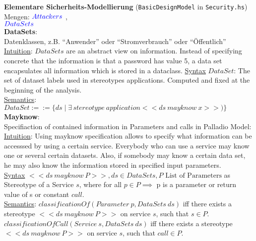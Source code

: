 \textbf{Elementare Sicherheits-Modellierung} (\texttt{BasicDesignModel} in \texttt{Security.hs})\\

Mengen: ${\color{blue}{Attackers}}$ , \\
        ${\color{blue}{DataSets}}$ \\
        
\textbf{DataSets}: \\
Datenklassen, z.B. \enquote{Anwender} oder \enquote{Stromverbrauch} oder \enquote{Öffentlich} \\
\underline{Intuition}: $DataSets$ are an abstract view on information. 
Instead of specifying concrete that the information is that a password has value 5, a data set encapsulates all information which is stored in a dataclass.
\underline{Syntax} $DataSet$: The set of dataset labels used in stereotypes applications. Computed and fixed at the beginning of the analysis. \\ %
\underline{Semantics}: $DataSet := := \{ds \mid \exists \, stereotype~application <<ds~mayknow~x>>)\}$\\ %

\textbf{Mayknow}:\\
Specifiaction of contained information in Parameters and calls in Palladio Model: \\
\underline{Intuition}: Using mayknow specification allows to specify what information can be accesssed by using a certain service.
Everybody who can use a service may know one or several certain datasets.
Also, if somebody may know a certain data set, he may also know the information stored in specified input parameters.\\
\underline{Syntax} $<<ds~mayknow~P>>, ds \in DataSets, P \text{ List of Parameters}$ as Stereotype of a Service $s$, where for all $p \in P \implies$ p is a parameter or return value of s or constant $call$.\\
\underline{Semantics}: $classificationOf(Parameter~p, DataSets~ds)$ iff there exists a stereotype $<<ds~mayknow~P>>$ on service $s$, such that $s \in P$.\\
$classificationOfCall(Service~s, DataSets~ds)$ iff there exists a stereotype $<<ds~mayknow~P>>$ on service $s$, such that $call \in P$.


